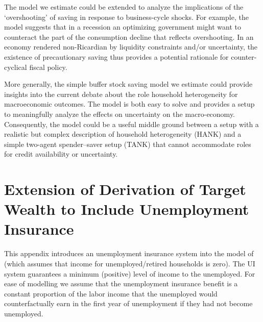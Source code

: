 \documentclass[titlepage]{\econtex}
\begin{document}
The model we estimate could be extended to analyze the implications of the `overshooting' of saving in response to business-cycle shocks. For example, the model suggests that in a recession an optimizing government might want to counteract the part of the consumption decline that reflects overshooting. In an economy rendered non-Ricardian by liquidity constraints and/or uncertainty, the existence of precautionary saving thus provides a potential rationale for counter-cyclical fiscal policy.

More generally, the simple buffer stock saving model we estimate could provide insights into the current debate about the role household heterogeneity for macroeconomic outcomes.  The model is both easy to solve and provides a setup to meaningfully analyze the effects on uncertainty on the macro-economy.  Consequently, the model could be a useful middle ground between a setup with a realistic but complex description of household heterogeneity (HANK) and a simple two-agent spender--saver setup (TANK) that cannot accommodate roles for credit availability or uncertainty.

\small

\clearpage\pagebreak





\clearpage\pagebreak



\clearpage



\clearpage
\appendix


\section{Extension of Derivation of Target Wealth to Include Unemployment Insurance}\label{apdxUIa}

This appendix introduces an unemployment insurance system  into the model of \cite{ctDiscrete} (which assumes that income for
unemployed/retired households is zero). The UI system guarantees a minimum (positive) level of income to the unemployed. For ease of modelling we assume that the unemployment insurance benefit is a
constant proportion of the labor income that the unemployed would counterfactually earn in the first year of unemployment if they had not become unemployed.
\end{document}
